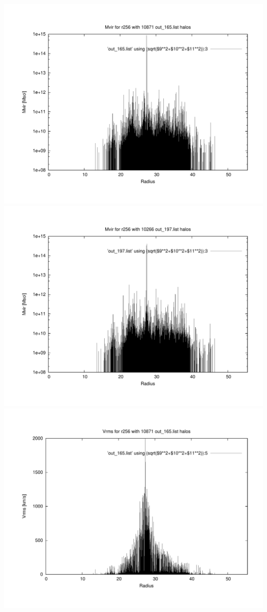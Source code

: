 \includegraphics[scale=0.3]{r256/h100/mm_h/plot_mvir_out_165.pdf}
\includegraphics[scale=0.3]{r256/h100/mm_h/plot_mvir_out_197.pdf}
\includegraphics[scale=0.3]{r256/h100/mm_h/plot_Vrms_out_165.pdf}
